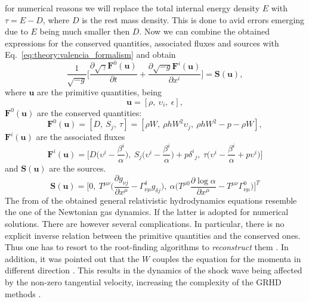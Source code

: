 %
for numerical reasons we will replace the total internal energy density $E$ with $\tau = E-D$, 
where $D$ is the rest mass density. This is done to avid errors emerging due to $E$ being much smaller then $D$. 
%
Now we can combine the obtained expressions for the conserved quantities, associated fluxes and sources with  Eq.~\eqref{eq:theory:valencia_formalism} and obtain
%
\begin{equation}
\frac{1}{\sqrt{-g}}\Big[\frac{\partial\sqrt{\gamma}\boldsymbol{F}^{0}(\boldsymbol{u})}{\partial t} + \frac{\partial\sqrt{-g}\boldsymbol{F}^{i}(\boldsymbol{u})}{\partial x^i}\Big] = \boldsymbol{S}(\boldsymbol{u}),
\label{eq:theory:grhdeq_thc} %
\end{equation}
%
where $\boldsymbol{u}$ are the primitive quantities, being
%
\begin{equation*}
\boldsymbol{u} = [\rho,\: \upsilon_i,\: \epsilon],
\end{equation*}
%
$\boldsymbol{F}^0(\boldsymbol{u})$ are the conserved quantities: 
%
\begin{equation*}
\boldsymbol{F}^0(\boldsymbol{u}) = [D,\: S_j,\: \tau] = [\rho W,\: \rho h W^2 \upsilon_j,\: \rho h W^2 - p - \rho W],
\end{equation*}
%
$\boldsymbol{F}^i(\boldsymbol{u})$ are the associated fluxes
%
\begin{equation*}
\boldsymbol{F}^i(\boldsymbol{u})=\Bigg[D\Big(\upsilon^{i}-\frac{\beta^i}{\alpha}\Big),\: S_{j}\Big(\upsilon^{i}-\frac{\beta^i}{\alpha}\Big)+p{\delta^i}_j ,\: \tau\Big(\upsilon^{i}-\frac{\beta^i}{\alpha}+p\upsilon^i\Big)\Bigg]
\end{equation*}
%
and $\boldsymbol{S}(\boldsymbol{u})$ are the sources.
%
\begin{equation*}
\boldsymbol{S}(\boldsymbol{u}) = \Bigg[0,\: T^{\mu\nu}\Big(\frac{\partial g_{\nu j}}{\partial x^{\mu}} - \Gamma^{\delta}_{\nu\mu}g_{\delta j}\Big),\: \alpha\Big(T^{\mu 0}\frac{\partial\log\alpha}{\partial x^{\mu}}-T^{\mu\nu}\Gamma^{0}_{\nu\mu}\Big)\Bigg]^T
\end{equation*}
%
The from of the obtained general relativistic hydrodynamics equations resemble 
the one of the Newtonian gas dynamics. If the latter is adopted for numerical solutions. 
%
There are however several complications. In particular, there is no explicit inverse relation between 
the primitive quantities and the conserved ones. Thus one has to resort to the root-finding algorithms to 
\textit{reconstruct} them . In addition, it was pointed out that the 
$W$ couples the equation for the momenta in different direction \citep{Pons:2000,Rezzolla:2002ra,Rezzolla:2002cc,Aloy:2006rd}. 
This results in the dynamics of the shock wave being affected by the non-zero tangential velocity,
increasing the complexity of the \ac{GRHD} methods \citep{Mignone:2005ns,Zhang:2005qy}.


